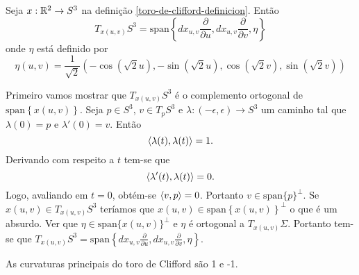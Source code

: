 \begin{proposicao}
	Seja $x:\mathbb R^2 \rightarrow S^3$ na definição \ref{toro-de-clifford-definicion}. Então
	\begin{equation*}
		T_{x(u,v)} S^3 = \text{span} \left\{dx_{u,v} \frac{\partial}{\partial u}, dx_{u,v} \frac{\partial}{\partial v}, \eta\right\}
	\end{equation*}
	onde $\eta$ está definido por
	\begin{equation*}
		\eta(u,v) = \frac{1}{\sqrt{2}} \left(-\cos(\sqrt{2} u), -\sin(\sqrt{2} u), \cos(\sqrt{2} v), \sin(\sqrt{2} v)\right)
	\end{equation*}
\end{proposicao}

\begin{demonstracao}
	Primeiro vamos mostrar que $T_{x(u,v)} S^3$ é o complemento ortogonal de $\text{span} \left\{x(u,v)\right\}$. Seja 
	$p \in S^3$,
	$ v \in T_p S^3 $
	e
	$\lambda: (-\epsilon, \epsilon) \rightarrow S^3$
	um caminho tal que
	$\lambda(0) = p$
	e
	$\lambda'(0) = v$.
	Então
	\begin{equation*}
	\left\langle \lambda(t),\lambda(t) \right\rangle = 1.
	\end{equation*}
	Derivando com respeito a $t$ tem-se que
	\begin{equation*}
	\left\langle \lambda'(t),\lambda(t) \right\rangle = 0.
	\end{equation*}
	Logo, avaliando em $ t=0 $, obtém-se
	$ \left\langle v,p \right\rangle = 0 $.
	Portanto
	$ v \in \text{span} \{p\}^\perp $.
	Se $x(u,v) \in T_{x(u,v)} S^3$ teríamos que $x(u,v) \in \text{span} \left\{x(u,v)\right\}^\perp$ o que é um absurdo.
	Ver que
	$\eta \in \text{span} \{x(u,v)\}^\perp$ e
	$\eta$ é ortogonal a $T_{x(u,v)} \Sigma$.
	Portanto tem-se que
	$T_{x(u,v)} S^3 = \text{span} \left\{dx_{u,v} \frac{\partial}{\partial u}, dx_{u,v} \frac{\partial}{\partial v}, \eta\right\}$.	
\end{demonstracao}


\begin{proposicao}
	As curvaturas principais do toro de Clifford são 1 e -1.
\end{proposicao}

